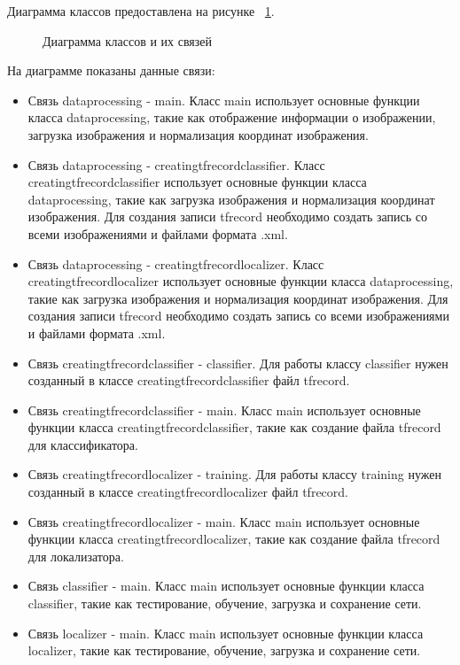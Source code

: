 Диаграмма классов предоставлена на рисунке ~\ref{classdiag:image}.

\begin{figure}[H]
\caption{Диаграмма классов и их связей}
\label{classdiag:image}
\end{figure}

На диаграмме показаны данные связи:
\begin{itemize}
	\item Связь dataprocessing - main. Класс main использует основные функции класса dataprocessing, такие как отображение информации о изображении, загрузка изображения и нормализация координат изображения.
	\item Связь dataprocessing - creatingtfrecordclassifier. Класс creatingtfrecordclassifier использует основные функции класса dataprocessing, такие как загрузка изображения и нормализация координат изображения. Для создания записи tfrecord необходимо создать запись со всеми изображениями и файлами формата .xml.
	\item Связь dataprocessing - creatingtfrecordlocalizer. Класс creatingtfrecordlocalizer использует основные функции класса dataprocessing, такие как загрузка изображения и нормализация координат изображения. Для создания записи tfrecord необходимо создать запись со всеми изображениями и файлами формата .xml.
	\item Связь creatingtfrecordclassifier - classifier. Для работы классу classifier нужен созданный в классе creatingtfrecordclassifier файл tfrecord.
	\item Связь creatingtfrecordclassifier - main.  Класс main использует основные функции класса creatingtfrecordclassifier, такие как создание файла tfrecord для классификатора.
	\item Связь creatingtfrecordlocalizer - training. Для работы классу training нужен созданный в классе creatingtfrecordlocalizer файл tfrecord.
	\item Связь creatingtfrecordlocalizer - main.  Класс main использует основные функции класса creatingtfrecordlocalizer, такие как создание файла tfrecord для локализатора.
	\item Связь classifier - main. Класс main использует основные функции класса classifier, такие как тестирование, обучение, загрузка и сохранение сети.
	\item Связь localizer - main. Класс main использует основные функции класса localizer, такие как тестирование, обучение, загрузка и сохранение сети.
\end{itemize}


